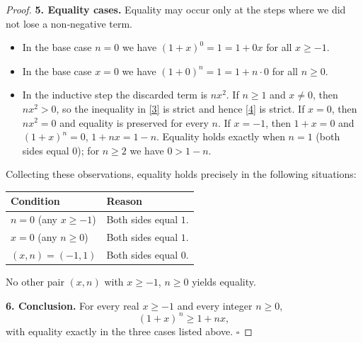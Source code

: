 \begin{proof}
\medskip\noindent\textbf{5. Equality cases.}  
Equality may occur only at the steps where we did not lose a non‑negative term.

\begin{itemize}
\item In the base case $n=0$ we have $(1+x)^{0}=1=1+0x$ for all $x\ge-1$.
\item In the base case $x=0$ we have $(1+0)^{n}=1=1+n\cdot0$ for all $n\ge0$.
\item In the inductive step the discarded term is $nx^{2}$.  
If $n\ge1$ and $x\neq0$, then $nx^{2}>0$, so the inequality in \eqref{3} is strict and hence \eqref{4} is strict.  
If $x=0$, then $nx^{2}=0$ and equality is preserved for every $n$.  
If $x=-1$, then $1+x=0$ and $(1+x)^{n}=0$, $1+nx=1-n$. Equality holds exactly when $n=1$ (both sides equal $0$); for $n\ge2$ we have $0>1-n$.
\end{itemize}

Collecting these observations, equality holds precisely in the following situations:

\begin{tabular}{ll}
\toprule
Condition & Reason \\ \midrule
$n=0$ (any $x\ge-1$) & Both sides equal $1$.\\
$x=0$ (any $n\ge0$) & Both sides equal $1$.\\
$(x,n)=(-1,1)$ & Both sides equal $0$.\\ \bottomrule
\end{tabular}

No other pair $(x,n)$ with $x\ge-1$, $n\ge0$ yields equality.

\medskip\noindent\textbf{6. Conclusion.}  
For every real $x\ge-1$ and every integer $n\ge0$,
\[
(1+x)^{\,n}\ge 1+nx ,
\]
with equality exactly in the three cases listed above. \(\square\)
\end{proof}